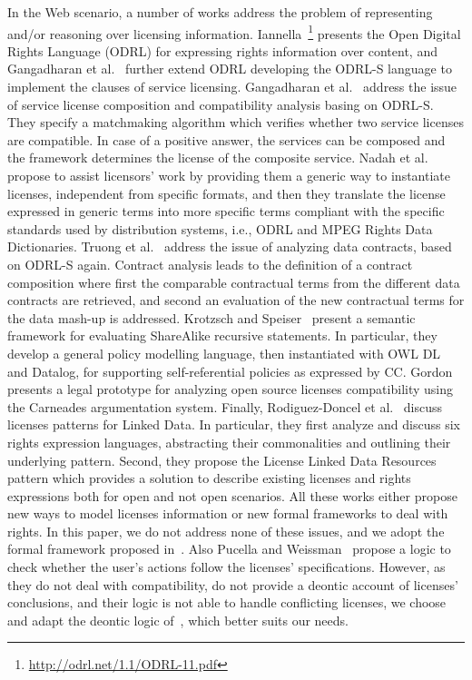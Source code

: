 In the Web scenario, a number of works address the problem of representing and/or reasoning over licensing information.
Iannella~\footnote{\url{http://odrl.net/1.1/ODRL-11.pdf}} presents the Open Digital Rights Language (ODRL) for expressing rights information over content, and Gangadharan et al.~\cite{ODRLS} further extend ODRL developing the ODRL-S language to implement the clauses of service licensing. 
%
Gangadharan et al.~\cite{DBLP:conf/icsoc/GangadharanWDI07} address the issue of service license composition and compatibility analysis basing on ODRL-S. They specify a matchmaking algorithm which verifies whether two service licenses are compatible. In case of a positive answer, the services can be composed and the framework determines the license of the composite service. 
%
Nadah et al.~\cite{DBLP:conf/icail/NadahRB07} propose to assist licensors' work by providing them a generic way to instantiate licenses, independent from specific formats, and then they translate the license expressed in generic terms into more specific terms compliant with the specific standards used by distribution systems, i.e., ODRL and MPEG Rights Data Dictionaries. 
%
Truong et al.~\cite{DBLP:conf/apscc/TruongGCDP11} address the issue of analyzing data contracts, based on ODRL-S again. Contract analysis leads to the definition of a contract composition where first the comparable contractual terms from the different data contracts are retrieved, and second an evaluation of the new contractual terms for the data mash-up is addressed.
%
Krotzsch and Speiser~\cite{DBLP:conf/semweb/KrotzschS11} present a semantic framework for evaluating ShareAlike recursive statements. In particular, they develop a general policy modelling language, then instantiated with OWL DL and Datalog, for supporting self-referential policies as expressed by CC.
%
Gordon~\cite{DBLP:conf/icail/Gordon11} presents a legal prototype for analyzing open source licenses compatibility using the Carneades argumentation system. 
%
Finally, Rodiguez-Doncel et al.~\cite{victorPatterns2013a,victorPatterns2013b} discuss licenses patterns for Linked Data. In particular, they first analyze and discuss six rights expression languages, abstracting their commonalities and outlining their underlying pattern. Second, they propose the License Linked Data Resources pattern which provides a solution to describe existing licenses and rights expressions both for open and not open scenarios. 
All these works either propose new ways to model licenses information or new formal frameworks to deal with rights. In this paper, we do not address none of these issues, and we adopt the formal framework proposed in~\cite{DBLP:conf/semweb/GovernatoriRVG13}. Also Pucella and Weissman~\cite{DBLP:conf/csfw/PucellaW02} propose a logic to check whether the user's actions follow the licenses' specifications. However, as they do not deal with compatibility, do not provide a deontic account of licenses' conclusions, and their logic is not able to handle conflicting licenses, we choose and adapt the deontic logic of~\cite{DBLP:conf/semweb/GovernatoriRVG13}, which better suits our needs.

